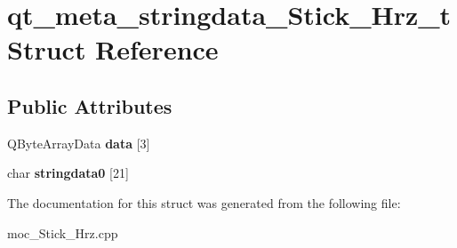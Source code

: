 \hypertarget{structqt__meta__stringdata__Stick__Hrz__t}{}\section{qt\+\_\+meta\+\_\+stringdata\+\_\+\+Stick\+\_\+\+Hrz\+\_\+t Struct Reference}
\label{structqt__meta__stringdata__Stick__Hrz__t}
\subsection*{Public Attributes}
\begin{DoxyCompactItemize}
\item 
Q\+Byte\+Array\+Data {\bfseries data} \mbox{[}3\mbox{]}\hypertarget{structqt__meta__stringdata__Stick__Hrz__t_a481c43d9b54e6a34f0d511af37373283}{}\label{structqt__meta__stringdata__Stick__Hrz__t_a481c43d9b54e6a34f0d511af37373283}

\item 
char {\bfseries stringdata0} \mbox{[}21\mbox{]}\hypertarget{structqt__meta__stringdata__Stick__Hrz__t_a3ad19400dc6f85cfbb40bf6def7ea6f6}{}\label{structqt__meta__stringdata__Stick__Hrz__t_a3ad19400dc6f85cfbb40bf6def7ea6f6}

\end{DoxyCompactItemize}


The documentation for this struct was generated from the following file\+:\begin{DoxyCompactItemize}
\item 
moc\+\_\+\+Stick\+\_\+\+Hrz.\+cpp\end{DoxyCompactItemize}
